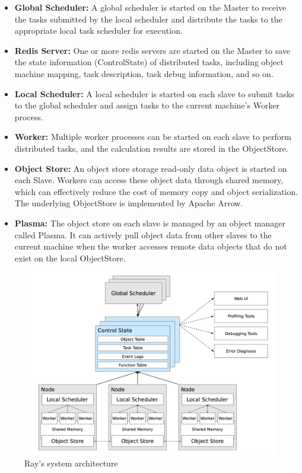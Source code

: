 \begin{itemize}
	\item \textbf{Global Scheduler:} A global scheduler is started on the Master to receive the tasks submitted by the local scheduler and distribute the tasks to the appropriate local task scheduler for execution.
	\item \textbf{Redis Server:} One or more redis servers are started on the Master to save the state information (ControlState) of distributed tasks, including object machine mapping, task description, task debug information, and so on.
	\item \textbf{Local Scheduler:} A local scheduler is started on each slave to submit tasks to the global scheduler and assign tasks to the current machine's Worker process.
	\item \textbf{Worker:} Multiple worker processes can be started on each slave to perform distributed tasks, and the calculation results are stored in the ObjectStore.
	\item \textbf{Object Store:} An object store storage read-only data object is started on each Slave. Workers can access these object data through shared memory, which can effectively reduce the cost of memory copy and object serialization. The underlying ObjectStore is implemented by Apache Arrow.
	\item \textbf{Plasma:} The object store on each slave is managed by an object manager called Plasma. It can actively pull object data from other slaves to the current machine when the worker accesses remote data objects that do not exist on the local ObjectStore.
\end{itemize}

\begin{figure}[!htb]
	\centering
	\includegraphics[width=\linewidth]{figures/ray_arch.png}
	\caption{Ray's system architecture}
	\label{fig:ray_arch}
\end{figure}



